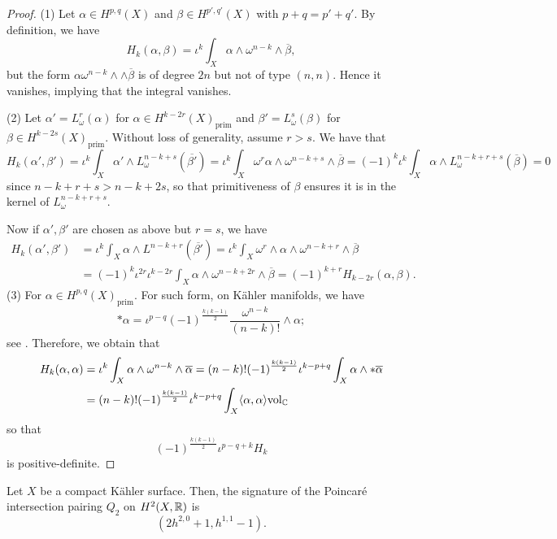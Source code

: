 \begin{proof}
(1) Let $\alpha\in H^{p,q}(X)$ and $\beta\in H^{p',q'}(X)$ with $p+q=p'+q'$. By definition, we have
\[
H_k(\alpha,\beta)=\iota^k\int_X\alpha\wedge\omega^{n-k}\wedge\overline{\beta},
\]
but the form $\alpha\omega^{n-k}\wedge \wedge\overline{\beta}$ is of degree $2n$ but not of type $(n,n)$. Hence it vanishes, implying that the integral vanishes.

(2) Let $\alpha'=L_\omega^r(\alpha)$ for $\alpha\in H^{k-2r}(X)_{\text{prim}}$ and $\beta'=L_\omega^s(\beta)$ for $\beta\in H^{k-2s}(X)_{\text{prim}}$. Without loss of generality, assume $r>s$. We have that
\[
H_k(\alpha',\beta')=\iota^k\int_X\alpha'\wedge L_\omega^{n-k+s}(\overline{\beta'})=\iota^k\int_X \omega ^r\alpha\wedge \omega^{n-k+s}\wedge\overline{\beta}=(-1)^k\iota^k\int_X \alpha\wedge L_\omega^{n-k+r+s}(\overline{\beta})=0
\]
since $n-k+r+s>n-k+2s$, so that primitiveness of $\beta$ ensures it is in the kernel of $L_\omega^{n-k+r+s}$.

Now if $\alpha',\beta'$ are chosen as above but $r=s$, we have
\begin{align*}
H_k(\alpha',\beta')&=\iota^k\int_X\alpha\wedge L^{n-k+r}(\overline{\beta'})=\iota^k\int_X\omega^{r}\wedge\alpha\wedge\omega^{n-k+r}\wedge\overline{\beta}\\&=(-1)^k\iota ^{2r}\iota^{k-2r}\int_X\alpha\wedge \omega^{n-k+2r}\wedge\overline{\beta}=(-1)^{k+r}H_{k-2r}(\alpha,\beta).
\end{align*}
%
(3) For $\alpha\in H^{p,q}(X)_{\text{prim}}$. For such form, on Kähler manifolds, we have
\[
*\alpha=\iota^{p-q}(-1)^{\frac{k(k-1)}{2}}\frac{\omega^{n-k}}{(n-k)!}\wedge\alpha;
\]
see \cite[Proposition 6.29]{Voisin1998}. Therefore, we obtain that 
\begin{align*}
H_k(\alpha,\alpha)&=\iota^{k}\int_X\alpha\wedge\omega^{n-k}\wedge\overline\alpha= (n-k)!(-1)^{\frac{k(k-1)}{2}}\iota^{k-p+q}\int_X\alpha\wedge*\overline \alpha\\
&= (n-k)!(-1)^{\frac{k(k-1)}{2}}\iota^{k-p+q}\int_X\langle \alpha,\alpha\rangle\text{vol}_\mathbb C
\end{align*}
so that 
\[
(-1)^{\frac{k(k-1)}{2}}\iota^{p-q+k}H_k
\]
is positive-definite.
\end{proof}	
%
\begin{corollary}
	Let $X$ be a compact Kähler surface. Then, the signature of the Poincaré intersection pairing $Q_2$ on $H^2(X,\mathbb R)$ is 
	\[
	(2h^{2,0}+1,h^{1,1}-1).
	\]
\end{corollary}
